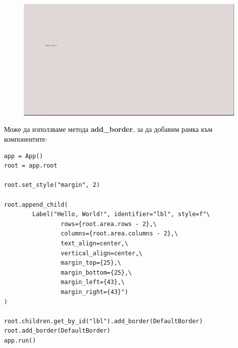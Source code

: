                 \vspace{5mm}
                \begin{figure}[h]
                        \centering
                        \includegraphics[width=150mm]{images/tutorial/hello-world-padding.png}
                        \caption{}
                        \label{fig:app-hello-world-padding}
                \end{figure}
                \vspace{5mm}

                Може да използваме метода \textbf{add\_border}, за да добавим
                рамка към компонентите:

                \begin{lstlisting}[style=py]
app = App()
root = app.root

root.set_style("margin", 2)

root.append_child(
        Label("Hello, World!", identifier="lbl", style=f"\
                rows={root.area.rows - 2},\
                columns={root.area.columns - 2},\
                text_align=center,\
                vertical_align=center,\
                margin_top={25},\
                margin_bottom={25},\
                margin_left={43},\
                margin_right={43}")
)

root.children.get_by_id("lbl").add_border(DefaultBorder)
root.add_border(DefaultBorder)
app.run()
                \end{lstlisting}

